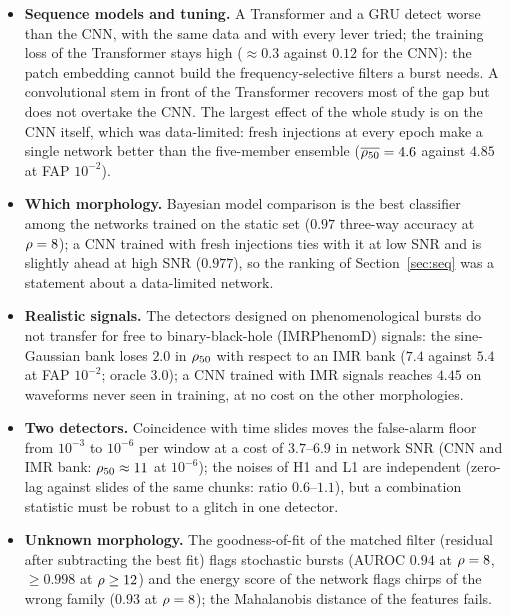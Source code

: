 \begin{itemize}[nosep]
\item \textbf{Sequence models and tuning.} A Transformer and a GRU detect worse than the CNN, with the same data and with every lever tried; the training loss of the Transformer stays high ($\approx0.3$ against $0.12$ for the CNN): the patch embedding cannot build the frequency-selective filters a burst needs. A convolutional stem in front of the Transformer recovers most of the gap but does not overtake the CNN. The largest effect of the whole study is on the CNN itself, which was data-limited: fresh injections at every epoch make a single network better than the five-member ensemble ($\overline{\rho_{50}}=4.6$ against $4.85$ at FAP $10^{-2}$).
\item \textbf{Which morphology.} Bayesian model comparison is the best classifier among the networks trained on the static set ($0.97$ three-way accuracy at $\rho=8$); a CNN trained with fresh injections ties with it at low SNR and is slightly ahead at high SNR ($0.977$), so the ranking of Section~\ref{sec:seq} was a statement about a data-limited network.
\item \textbf{Realistic signals.} The detectors designed on phenomenological bursts do not transfer for free to binary-black-hole (IMRPhenomD) signals: the sine-Gaussian bank loses $2.0$ in $\rho_{50}$ with respect to an IMR bank ($7.4$ against $5.4$ at FAP $10^{-2}$; oracle $3.0$); a CNN trained with IMR signals reaches $4.45$ on waveforms never seen in training, at no cost on the other morphologies.
\item \textbf{Two detectors.} Coincidence with time slides moves the false-alarm floor from $10^{-3}$ to $10^{-6}$ per window at a cost of $3.7$--$6.9$ in network SNR (CNN and IMR bank: $\rho_{50}\approx11$ at $10^{-6}$); the noises of H1 and L1 are independent (zero-lag against slides of the same chunks: ratio $0.6$--$1.1$), but a combination statistic must be robust to a glitch in one detector.
\item \textbf{Unknown morphology.} The goodness-of-fit of the matched filter (residual after subtracting the best fit) flags stochastic bursts (AUROC $0.94$ at $\rho=8$, $\ge0.998$ at $\rho\ge12$) and the energy score of the network flags chirps of the wrong family ($0.93$ at $\rho=8$); the Mahalanobis distance of the features fails.

\end{itemize}
